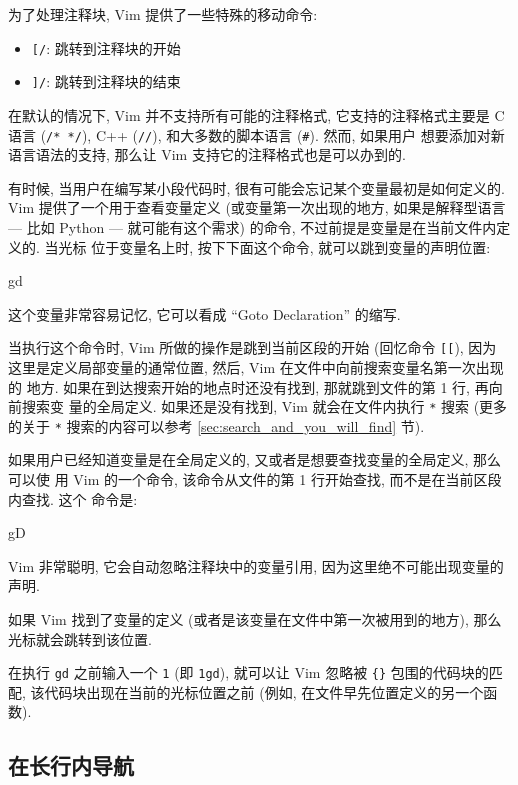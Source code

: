 为了处理注释块, Vim 提供了一些特殊的移动命令:
\begin{itemize}
    \item \verb'[/': 跳转到注释块的开始
    \item \verb']/': 跳转到注释块的结束
\end{itemize}

在默认的情况下, Vim 并不支持所有可能的注释格式, 它支持的注释格式主要是 C 语言
(\verb'/* */'), C++ (\verb'//'), 和大多数的脚本语言 (\verb'#'). 然而, 如果用户
想要添加对新语言语法的支持, 那么让 Vim 支持它的注释格式也是可以办到的.

有时候, 当用户在编写某小段代码时, 很有可能会忘记某个变量最初是如何定义的. Vim
提供了一个用于查看变量定义 (或变量第一次出现的地方, 如果是解释型语言 --- 比如
Python --- 就可能有这个需求) 的命令, 不过前提是变量是在当前文件内定义的. 当光标
位于变量名上时, 按下下面这个命令, 就可以跳到变量的声明位置:
\begin{vimcode}
gd
\end{vimcode}
这个变量非常容易记忆, 它可以看成 ``Goto Declaration'' 的缩写.

当执行这个命令时, Vim 所做的操作是跳到当前区段的开始 (回忆命令 \verb'[['), 因为
这里是定义局部变量的通常位置, 然后, Vim 在文件中向前搜索变量名第一次出现的
地方. 如果在到达搜索开始的地点时还没有找到, 那就跳到文件的第 1 行, 再向前搜索变
量的全局定义. 如果还是没有找到, Vim 就会在文件内执行 \verb'*' 搜索 (更多的关于
\verb'*' 搜索的内容可以参考 \ref{sec:search_and_you_will_find} 节).

如果用户已经知道变量是在全局定义的, 又或者是想要查找变量的全局定义, 那么可以使
用 Vim 的一个命令, 该命令从文件的第 1 行开始查找, 而不是在当前区段内查找. 这个
命令是:
\begin{vimcode}
gD
\end{vimcode}
Vim 非常聪明, 它会自动忽略注释块中的变量引用, 因为这里绝不可能出现变量的声明.

如果 Vim 找到了变量的定义 (或者是该变量在文件中第一次被用到的地方),
那么光标就会跳转到该位置.

\begin{tips}
    在执行 \texttt{gd} 之前输入一个 \texttt{1} (即 \texttt{1gd}), 就可以让 Vim
    忽略被 \verb'{}' 包围的代码块的匹配, 该代码块出现在当前的光标位置之前
    (例如, 在文件早先位置定义的另一个函数).
\end{tips}

\subsection{在长行内导航}
\label{subsec:navigating_long_lines}

